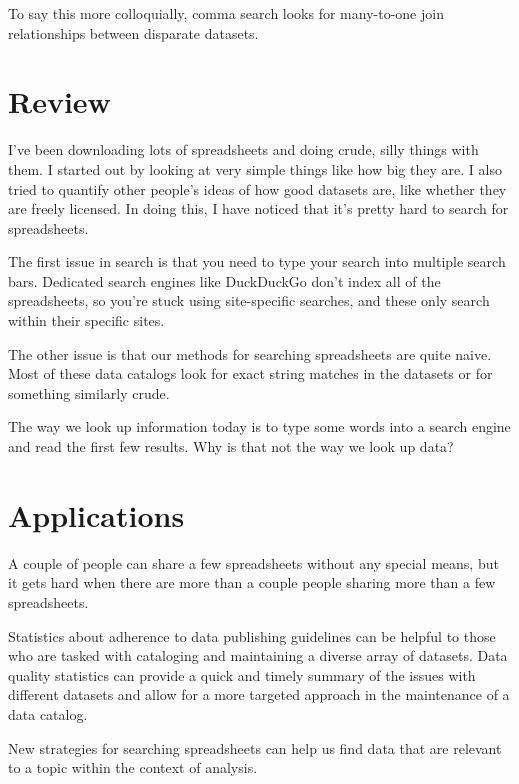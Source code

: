 \documentclass{acm_proc_article-sp}
\begin{document}
To say this more colloquially, comma search looks for many-to-one join
relationships between disparate datasets.

\section{Review}
I've been downloading lots of spreadsheets and doing crude, silly things
with them.
I started out by looking at very simple things like how big they are.
I also tried to quantify other people's ideas of how good datasets are,
like whether they are freely licensed. In doing this, I have noticed that
it's pretty hard to search for spreadsheets.

The first issue in search is that you need to type your search into multiple search
bars. Dedicated search engines like DuckDuckGo don't index all of the
spreadsheets, so you're stuck using site-specific searches, and these only
search within their specific sites.

The other issue is that our methods for searching spreadsheets are quite naive.
Most of these data catalogs look for exact string matches in the datasets or
for something similarly crude.

The way we look up information today is to type some words into a search engine
and read the first few results. Why is that not the way we look up data?














\section{Applications}
A couple of people can share a few spreadsheets without any special means,
but it gets hard when there are more than a couple people sharing more than
a few spreadsheets.

Statistics about adherence to data publishing guidelines
can be helpful to those who are tasked
with cataloging and maintaining a diverse array of datasets. Data quality
statistics can provide a quick and timely summary of the issues with different
datasets and allow for a more targeted approach in the maintenance of a
data catalog.

New strategies for searching spreadsheets can help us find data that are
relevant to a topic within the context of analysis.



\balancecolumns
\end{document}
